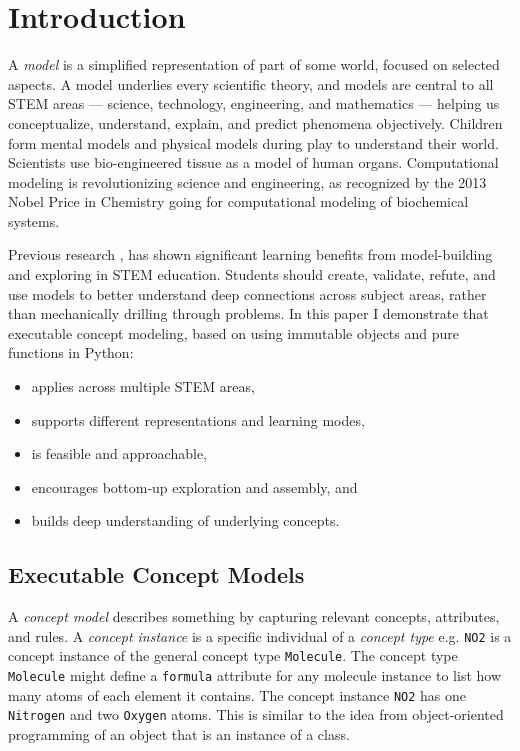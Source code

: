 \documentclass[letterpaper,compsoc,twoside]{IEEEtran}
\begin{document}
\section{Introduction\label{introduction}}


A \emph{model} is a simplified representation of part of some world, focused on selected aspects. A model underlies every scientific theory, and models are central to all STEM areas — science, technology, engineering, and mathematics — helping us conceptualize, understand, explain, and predict phenomena objectively. Children form mental models and physical models during play to understand their world. Scientists use bio-engineered tissue as a model of human organs. Computational modeling is revolutionizing science and engineering, as recognized by the 2013 Nobel Price in Chemistry going for computational modeling of biochemical systems.



Previous research \cite{Whi93}, \cite{Orn08} has shown significant learning benefits from model-building and exploring in STEM education. Students should create, validate, refute, and use models to better understand deep connections across subject areas, rather than mechanically drilling through problems. In this paper I demonstrate that executable concept modeling, based on using immutable objects and pure functions in Python:\begin{itemize}

\item 

applies across multiple STEM areas,
\item 

supports different representations and learning modes,
\item 

is feasible and approachable,
\item 

encourages bottom-up exploration and assembly, and
\item 

builds deep understanding of underlying concepts.
\end{itemize}




\subsection{Executable Concept Models\label{executable-concept-models}}


A \emph{concept model} describes something by capturing relevant concepts, attributes, and rules. A \emph{concept instance} is a specific individual of a \emph{concept type} e.g. \texttt{NO2} is a concept instance of the general concept type \texttt{Molecule}. The concept type \texttt{Molecule} might define a \texttt{formula} attribute for any molecule instance to list how many atoms of each element it contains. The concept instance \texttt{NO2} has one \texttt{Nitrogen} and two \texttt{Oxygen} atoms. This is similar to the idea from object-oriented programming of an object that is an instance of a class.
\end{document}
